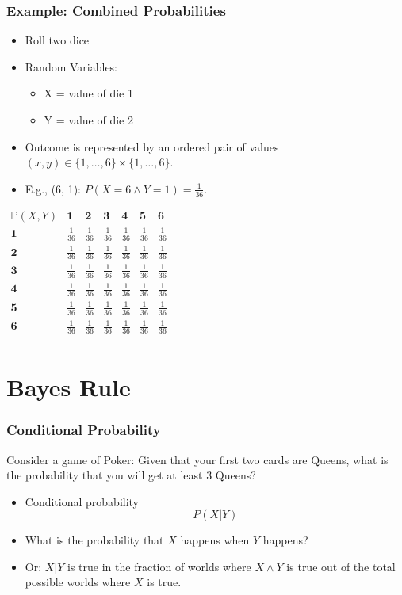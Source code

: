 \documentclass[xcolor=dvipsnames,ignorenonframetext]{beamer}
\newcommand{\Pb}{\mathbb{P}}
\begin{document}
\begin{frame}
  \frametitle{Example: Combined Probabilities}
  \begin{itemize}
  \item Roll two dice
  \item Random Variables:
    \begin{itemize}
    \item X = value of die 1
    \item Y = value of die 2
    \end{itemize}
  \item Outcome is represented by an ordered pair of values $(x, y)\in\{1,\ldots,6\}\times\{1,\ldots,6\}$.
  \item E.g., (6, 1): $P(X=6\wedge Y=1) = \frac{1}{36}$.
  \end{itemize}
  $\begin{array}{r|c|c|c|c|c|c}
    \textbf{$\Pb(X,Y)$} & \textbf{1} & \textbf{2} & \textbf{3} & \textbf{4} & \textbf{5} & \textbf{6}\\\hline
    \textbf{1} & \frac{1}{36} & \frac{1}{36} & \frac{1}{36} & \frac{1}{36} & \frac{1}{36}& \frac{1}{36}\\\hline
    \textbf{2} & \frac{1}{36} & \frac{1}{36} & \frac{1}{36} & \frac{1}{36} & \frac{1}{36}& \frac{1}{36}\\\hline
    \textbf{3} & \frac{1}{36} & \frac{1}{36} & \frac{1}{36} & \frac{1}{36} & \frac{1}{36}& \frac{1}{36}\\\hline
    \textbf{4} & \frac{1}{36} & \frac{1}{36} & \frac{1}{36} & \frac{1}{36} & \frac{1}{36}& \frac{1}{36}\\\hline
    \textbf{5} & \frac{1}{36} & \frac{1}{36} & \frac{1}{36} & \frac{1}{36} & \frac{1}{36}& \frac{1}{36}\\\hline
    \textbf{6} & \frac{1}{36} & \frac{1}{36} & \frac{1}{36} & \frac{1}{36} & \frac{1}{36}& \frac{1}{36}\\
  \end{array}$
\end{frame}

\section{Bayes Rule}

\begin{frame}
  \frametitle{Conditional Probability} 

  Consider a game of Poker: Given that your
  first two cards are Queens, what is the probability that you will get at least
  3 Queens?

  \begin{itemize}
  \item Conditional probability 
    \[P(X|Y)\]
  \item What is the probability that $X$ happens when $Y$ happens?
  \item Or: $X | Y$ is true in the fraction of worlds where $X\wedge Y$ is true
    out of the total possible worlds where $X$ is true.
  \end{itemize}
\end{frame}
\end{document}
